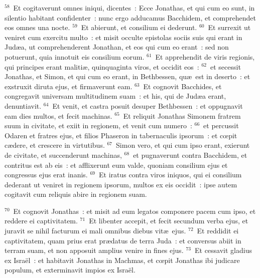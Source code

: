 ${}^{58}$~Et cogitaverunt omnes iniqui, dicentes~: Ecce Jonathas, et qui cum eo sunt, in silentio habitant confidenter~: nunc ergo adducamus Bacchidem, et comprehendet eos omnes una nocte.
${}^{59}$~Et abierunt, et consilium ei dederunt.
${}^{60}$~Et surrexit ut veniret cum exercitu multo~: et misit occulte epistolas sociis suis qui erant in Jud\ae a, ut comprehenderent Jonathan, et eos qui cum eo erant~: sed non potuerunt, quia innotuit eis consilium eorum.
${}^{61}$~Et apprehendit de viris regionis, qui principes erant maliti\ae , quinquaginta viros, et occidit eos~:
${}^{62}$~et secessit Jonathas, et Simon, et qui cum eo erant, in Bethbessen, qu\ae\ est in deserto~: et exstruxit diruta ejus, et firmaverunt eam.
${}^{63}$~Et cognovit Bacchides, et congregavit universam multitudinem suam~: et his, qui de Jud\ae a erant, denuntiavit.
${}^{64}$~Et venit, et castra posuit desuper Bethbessen~: et oppugnavit eam dies multos, et fecit machinas.
${}^{65}$~Et reliquit Jonathas Simonem fratrem suum in civitate, et exiit in regionem, et venit cum numero~:
${}^{66}$~et percussit Odaren et fratres ejus, et filios Phaseron in tabernaculis ipsorum~: et cœpit c\ae dere, et crescere in virtutibus.
${}^{67}$~Simon vero, et qui cum ipso erant, exierunt de civitate, et succenderunt machinas,
${}^{68}$~et pugnaverunt contra Bacchidem, et contritus est ab eis~: et afflixerunt eum valde, quoniam consilium ejus et congressus ejus erat inanis.
${}^{69}$~Et iratus contra viros iniquos, qui ei consilium dederant ut veniret in regionem ipsorum, multos ex eis occidit~: ipse autem cogitavit cum reliquis abire in regionem suam.


${}^{70}$~Et cognovit Jonathas~: et misit ad eum legatos componere pacem cum ipso, et reddere ei captivitatem.
${}^{71}$~Et libenter accepit, et fecit secundum verba ejus, et juravit se nihil facturum ei mali omnibus diebus vit\ae\ ejus.
${}^{72}$~Et reddidit ei captivitatem, quam prius erat pr\ae datus de terra Juda~: et conversus abiit in terram suam, et non apposuit amplius venire in fines ejus.
${}^{73}$~Et cessavit gladius ex Isra\"el~: et habitavit Jonathas in Machmas, et cœpit Jonathas ibi judicare populum, et exterminavit impios ex Isra\"el.

